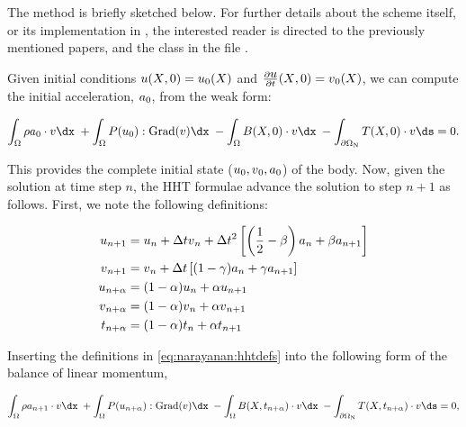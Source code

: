 The method is briefly sketched below. For further details about the
scheme itself, or its implementation in \twist, the interested reader
is directed to the previously mentioned papers, and the  class in the file .

Given initial conditions $\mbox{$ u$}(\mbox{$ X$}, 0) = \mbox{$ u$}_{0}(\mbox{$ X$})$ and
$\frac{\partial\mbox{$ u$}}{\partial t}(\mbox{$ X$}, 0) = \mbox{$ v$}_{0}(\mbox{$ X$})$, we can
compute the initial acceleration, $\mbox{$ a$}_{0}$, from the weak form:

\begin{equation}
  \int_{\Omega} \rho a_{0} \cdot \bv \dx\; +  \int_{\Omega}
\bP(u_{0}):\mathrm{Grad}(\bv) \dx\; - \int_{\Omega} \bB(X, 0)
\cdot \bv \dx\; -  \int_{\partial\Omega_{\mathrm{N}}}
\bT(X, 0) \cdot \bv \ds = 0.
\end{equation}

\noindent This provides the complete initial state ($\mbox{$ u$}_{0}, \mbox{$ v$}_{0},
\mbox{$ a$}_{0}$) of the body. Now, given the solution at time step $n$, the HHT
formulae advance the solution to step $n+1$ as follows. First, we note
the following definitions:

\begin{equation}
\begin{split}
\mbox{$ u$}_{n+1} & = \mbox{$ u$}_{n} + \Delta t \mbox{$ v$}_{n} + \Delta t^{2} \left[
  \left(\frac{1}{2} - \beta \right) \mbox{$ a$}_{n} + \beta \mbox{$ a$}_{n+1}
\right]\\
\mbox{$ v$}_{n+1} & = \mbox{$ v$}_{n} + \Delta t \left[ (1-\gamma) \mbox{$ a$}_{n} + \gamma
  \mbox{$ a$}_{n+1} \right]\\
\mbox{$ u$}_{n+\alpha} & = (1 - \alpha) \mbox{$ u$}_{n} + \alpha \mbox{$ u$}_{n+1}\\
\mbox{$ v$}_{n+\alpha} & = (1 - \alpha) \mbox{$ v$}_{n} + \alpha \mbox{$ v$}_{n+1}\\
t_{n+\alpha} &= (1 - \alpha) t_{n} + \alpha t_{n + 1}
\end{split}
\label{eq:narayanan:hhtdefs}
\end{equation}

\noindent Inserting the definitions in \eqref{eq:narayanan:hhtdefs}
into the following form of the balance of linear momentum,

\begin{equation}
   \int_{\Omega} \rho a_{n+1} \cdot \bv \dx\; + \int_{\Omega} \bP(u_{n
+ \alpha}):\mathrm{Grad}(\bv) \dx\; - \int_{\Omega} \bB(X, t_{n +
\alpha}) \cdot \bv \dx\; - \int_{\partial\Omega_{\mathrm{N}}} \bT(X,
t_{n + \alpha}) \cdot \bv \ds = 0,
\label{eq:narayanan:newaccn}
\end{equation}

